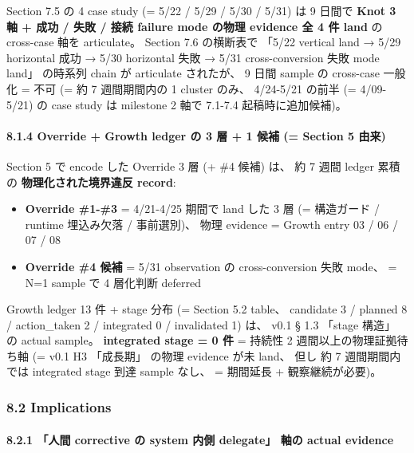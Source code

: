 \documentclass[
]{article}
\providecommand{\tightlist}{%
  \setlength{\itemsep}{0pt}\setlength{\parskip}{0pt}}
\begin{document}
Section 7.5 の 4 case study (= 5/22 / 5/29 / 5/30 / 5/31) は 9 日間で
\textbf{Knot 3 軸 + 成功 / 失敗 / 接続 failure mode の物理 evidence 全 4
件 land} の cross-case 軸を articulate。 Section 7.6 の横断表で 「5/22
vertical land → 5/29 horizontal 成功 → 5/30 horizontal 失敗 → 5/31
cross-conversion 失敗 mode land」 の時系列 chain が articulate
されたが、 9 日間 sample の cross-case 一般化 = 不可 (= 約 7
週間期間内の 1 cluster のみ、 4/24-5/21 の前半 (= 4/09-5/21) の case
study は milestone 2 軸で 7.1-7.4 起稿時に追加候補)。

\paragraph{8.1.4 Override + Growth ledger の 3 層 + 1 候補 (= Section 5
由来)}\label{override-growth-ledger-ux306e-3-ux5c64-1-ux5019ux88dc-section-5-ux7531ux6765}

Section 5 で encode した Override 3 層 (+ \#4 候補) は、 約 7 週間
ledger 累積の \textbf{物理化された境界違反 record}:

\begin{itemize}
\tightlist
\item
  \textbf{Override \#1-\#3} = 4/21-4/25 期間で land した 3 層 (=
  構造ガード / runtime 埋込み欠落 / 事前選別)、 物理 evidence = Growth
  entry 03 / 06 / 07 / 08
\item
  \textbf{Override \#4 候補} = 5/31 observation の cross-conversion 失敗
  mode、 = N=1 sample で 4 層化判断 deferred
\end{itemize}

Growth ledger 13 件 + stage 分布 (= Section 5.2 table、 candidate 3 /
planned 8 / action\_taken 2 / integrated 0 / invalidated 1) は、 v0.1 §
1.3 「stage 構造」 の actual sample。 \textbf{integrated stage = 0 件} =
持続性 2 週間以上の物理証拠待ち軸 (= v0.1 H3 「成長期」 の物理 evidence
が未 land、 但し 約 7 週間期間内では integrated stage 到達 sample なし、
= 期間延長 + 観察継続が必要)。

\subsubsection{8.2 Implications}\label{implications}

\paragraph{8.2.1 「人間 corrective の system 内側 delegate」 軸の actual
evidence}\label{ux4ebaux9593-corrective-ux306e-system-ux5185ux5074-delegate-ux8ef8ux306e-actual-evidence}
\end{document}
